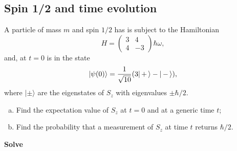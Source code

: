 \subsection{Spin 1/2 and time evolution}
A particle of mass $m$ and spin $1/2$ has is subject to the Hamiltonian
\begin{equation}
    \label{eq: H_spin_time_evolution}
    H = 
    \begin{pmatrix}
        3 & 4 \\
        4 & -3
    \end{pmatrix}
    \hbar \omega,
\end{equation}
and, at $t=0$ is in the state
\begin{equation}
    \label{eq: psi0_time_evolution}
    | \psi (0) \rangle = \frac{1}{\sqrt{10}} ( 3 | \, + \, \rangle - | \, - \, \rangle),
\end{equation}
where $| \pm \rangle$ are the eigenstates of $S_z$ with eigenvalues $\pm \hbar/2$.
\begin{enumerate}[(a)]
    \item Find the expectation value of $S_z$ at $t=0$ and at a generic time $t$;
    \item Find the probability that a measurement of $S_z$ at time $t$ returns $\hbar/2$.
\end{enumerate}

\textbf{Solve}

